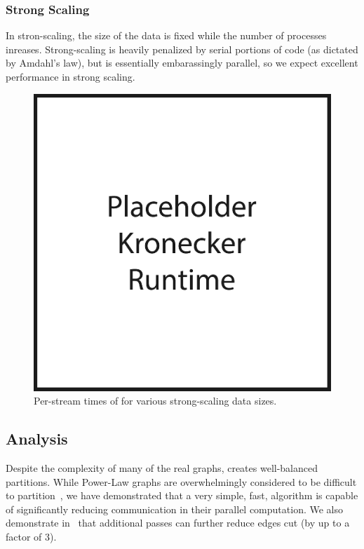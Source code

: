 \subsubsection{Strong Scaling}
In stron-scaling, the size of the data is fixed while the number of processes inreases. Strong-scaling is heavily penalized by serial portions of code (as dictated by Amdahl's law), but \ourmethod is essentially embarassingly parallel, so we expect excellent performance in strong scaling. 

\begin{figure}[h!]
\centering
  \includegraphics[width=0.8\columnwidth]{figures/kronecker_speed_tests.pdf}
  \caption{Per-stream times of \ourmethod for various strong-scaling data sizes.}
  \label{fig:kronspeed}
\end{figure}


\subsection{Analysis}
Despite the complexity of many of the real graphs, \ourmethod creates well-balanced partitions.
While Power-Law graphs are overwhelmingly considered to be difficult to partition~\cite{Abou-Rjeili:2006:MAP:1898953.1899055}, we have demonstrated that a very simple, fast, algorithm is capable of significantly reducing communication in their parallel computation. 
We also demonstrate in~ that additional passes can further reduce edges cut (by up to a factor of 3). 

